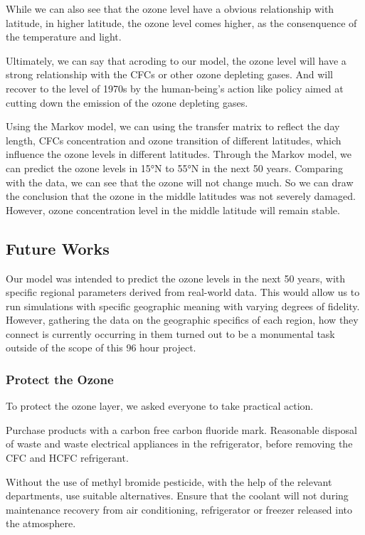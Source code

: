 \documentclass[12pt]{article}
\begin{document}
While we can also see that the ozone level have a obvious relationship with latitude, in higher latitude, the ozone level comes higher, as the consenquence of the temperature and light. 

Ultimately, we can say that acroding to our model, the ozone level will have a strong relationship with the CFCs or other ozone depleting  gases. And will recover to the level of 1970s by the human-being's action like policy aimed at cutting down the emission of the ozone depleting gases. 

Using the Markov model, we can using the transfer matrix to reflect the day length, CFCs concentration and ozone transition of different latitudes, which influence the ozone levels in different latitudes. Through the Markov model, we can predict the ozone levels in 15°N to 55°N in the next 50 years. Comparing with the data, we can see that the ozone will not change much. So we can draw the conclusion that the ozone in the middle latitudes was not severely damaged. However, ozone concentration level in the middle latitude will remain stable.
\subsection{Future Works}
Our model was intended to predict the ozone levels in the next 50 years, with specific regional parameters derived from real-world data. This would allow us to run simulations with specific geographic meaning with varying degrees of fidelity. However, gathering the data on the geographic specifics of each region, how they connect  is currently occurring in them turned out to be a monumental task outside of the scope of this 96 hour project.

\subsubsection{Protect the Ozone}
To protect the ozone layer, we asked everyone to take practical action. 

Purchase products with a carbon free carbon fluoride mark. Reasonable disposal of waste and waste electrical appliances in the refrigerator, before removing the CFC and HCFC refrigerant. 

Without the use of methyl bromide pesticide, with the help of the relevant departments, use suitable alternatives. Ensure that the coolant will not during maintenance recovery from air conditioning, refrigerator or freezer released into the atmosphere.
\end{document}
